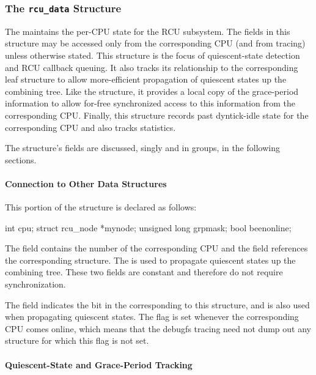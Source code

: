 \subsubsection{The \texttt{rcu\_data} Structure}

The  maintains the per-CPU state for the RCU subsystem.
The
fields in this structure may be accessed only from the corresponding CPU
(and from tracing) unless otherwise stated.
This structure is the focus
of quiescent-state detection and RCU callback queuing.
It also tracks
its relationship to the corresponding leaf  structure to
allow more-efficient propagation of quiescent states up the 
combining tree.
Like the  structure, it provides a local
copy of the grace-period information to allow for-free synchronized
access to this information from the corresponding CPU\@.
Finally, this
structure records past dyntick-idle state for the corresponding CPU and
also tracks statistics.

The  structure's fields are discussed, singly and in groups,
in the following sections.

\paragraph{Connection to Other Data Structures}

This portion of the  structure is declared as follows:

\begin{VerbatimN}
		int cpu;
		struct rcu_node *mynode;
		unsigned long grpmask;
		bool beenonline;
\end{VerbatimN}

The  field contains the number of the corresponding CPU and the
 field references the corresponding  structure.
The  is used to propagate quiescent states up the combining
tree.
These two fields are constant and therefore do not require
synchronization.

The  field indicates the bit in the 
corresponding to this  structure, and is also used when
propagating quiescent states.
The  flag is set whenever
the corresponding CPU comes online, which means that the debugfs tracing
need not dump out any  structure for which this flag is not
set.

\paragraph{Quiescent-State and Grace-Period Tracking}

